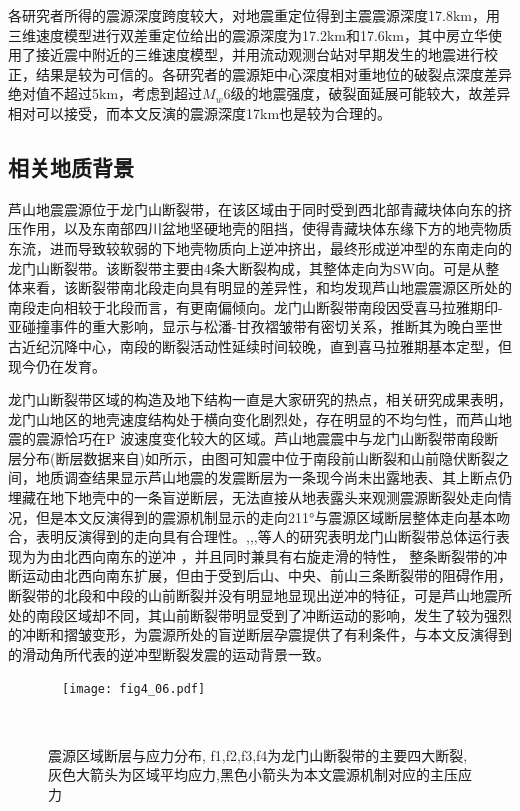 各研究者所得的震源深度跨度较大，对地震重定位得到主震震源深度17.8km，用三维速度模型进行双差重定位给出的震源深度为17.2km和17.6km，其中房立华使用了接近震中附近的三维速度模型，并用流动观测台站对早期发生的地震进行校正，结果是较为可信的。各研究者的震源矩中心深度相对重地位的破裂点深度差异绝对值不超过5km，考虑到超过$M_w$6级的地震强度，破裂面延展可能较大，故差异相对可以接受，而本文反演的震源深度17km也是较为合理的。

\subsection{相关地质背景}
芦山地震震源位于龙门山断裂带，在该区域由于同时受到西北部青藏块体向东的挤压作用，以及东南部四川盆地坚硬地壳的阻挡，使得青藏块体东缘下方的地壳物质东流，进而导致较软弱的下地壳物质向上逆冲挤出，最终形成逆冲型的东南走向的龙门山断裂带\citep{Zhang2013}。该断裂带主要由4条大断裂构成，其整体走向为SW向。可是从整体来看，该断裂带南北段走向具有明显的差异性\citep{Jia2006,Arne1997}，和均发现芦山地震震源区所处的南段走向相较于北段而言，有更南偏倾向。龙门山断裂带南段因受喜马拉雅期印-亚碰撞事件的重大影响，显示与松潘-甘孜褶皱带有密切关系，推断其为晚白垩世古近纪沉降中心，南段的断裂活动性延续时间较晚，直到喜马拉雅期基本定型，但现今仍在发育。

龙门山断裂带区域的构造及地下结构一直是大家研究的热点，相关研究成果\citep{Zhang2013,Wang2010,zhangzhongjie2009,Zhang2011,leijianzhe2009}表明，龙门山地区的地壳速度结构处于横向变化剧烈处，存在明显的不均匀性，而芦山地震的震源恰巧在P 波速度变化较大的区域。芦山地震震中与龙门山断裂带南段断层分布(断层数据来自)如所示，由图可知震中位于南段前山断裂和山前隐伏断裂之间，地质调查结果显示芦山地震的发震断层为一条现今尚未出露地表、其上断点仍埋藏在地下地壳中的一条盲逆断层，无法直接从地表露头来观测震源断裂处走向情况，但是本文反演得到的震源机制显示的走向211°与震源区域断层整体走向基本吻合，表明反演得到的走向具有合理性。,,\citet{Densmore2007},等人的研究表明龙门山断裂带总体运行表现为为由北西向南东的逆冲 ，并且同时兼具有右旋走滑的特性， 整条断裂带的冲断运动由北西向南东扩展，但由于受到后山、中央、前山三条断裂带的阻碍作用，断裂带的北段和中段的山前断裂并没有明显地显现出逆冲的特征，可是芦山地震所处的南段区域却不同，其山前断裂带明显受到了冲断运动的影响，发生了较为强烈的冲断和摺皱变形，为震源所处的盲逆断层孕震提供了有利条件，与本文反演得到的滑动角所代表的逆冲型断裂发震的运动背景一致。
\begin{figure}
\centering
  \texttt{[image: fig4\_06.pdf]}
  \caption{ 震源区域断层与应力分布, f1,f2,f3,f4为龙门山断裂带的主要四大断裂,灰色大箭头为区域平均应力,黑色小箭头为本文震源机制对应的主压应力}
  \label{fig4_06}
\end{figure}

